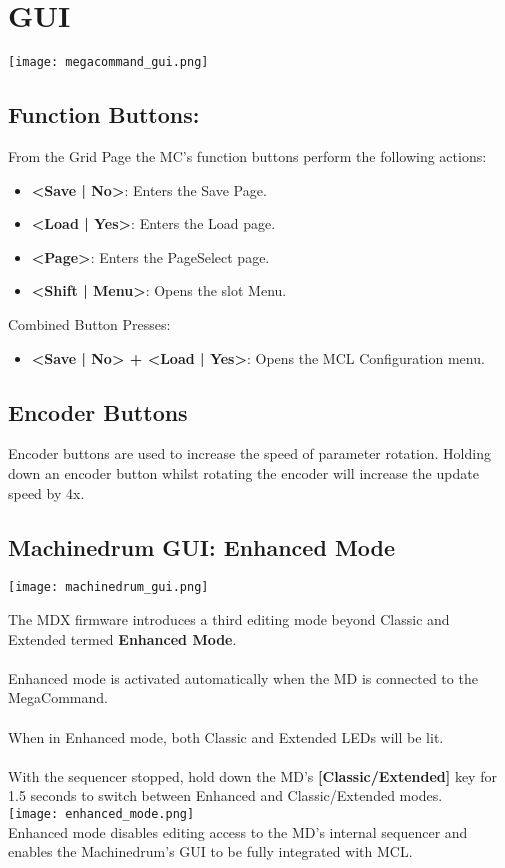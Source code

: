 \chapter{GUI}
\begin{center}
   \texttt{[image: megacommand\_gui.png]}
\end{center}
\section{Function Buttons:}
From the Grid Page the MC's function buttons perform the following actions:
\begin{itemize}
\item{\textbf{<Save | No>}: Enters the Save Page.}
\item{\textbf{<Load | Yes>}: Enters the Load page.}
\item{\textbf{<Page>}: Enters the PageSelect page.}
\item{\textbf{<Shift | Menu>}: Opens the slot Menu. }
\end{itemize}
Combined Button Presses:
\begin{itemize}
\item{\textbf{<Save | No> + <Load | Yes>}: Opens the MCL Configuration menu. }
\end{itemize}

\section{Encoder Buttons}
Encoder buttons are used to increase the speed of parameter rotation.
Holding down an encoder button whilst rotating the encoder will increase the update speed by 4x.

\newpage
\section{Machinedrum GUI: Enhanced Mode}
\texttt{[image: machinedrum\_gui.png]}

The MDX firmware introduces a third editing mode beyond Classic and Extended termed \textbf{Enhanced Mode}.\\
\\
Enhanced mode is activated automatically when the MD is connected to the MegaCommand.\\
\\
When in Enhanced mode, both Classic and Extended LEDs will be lit. \\\\With the sequencer stopped, hold down the MD's \textbf{[Classic/Extended]} key for 1.5 seconds to switch between Enhanced and Classic/Extended modes.\\
\texttt{[image: enhanced\_mode.png]}\\
Enhanced mode disables editing access to the MD's internal sequencer and enables the Machinedrum's GUI to be fully integrated with MCL.
\\\\
\newpage
